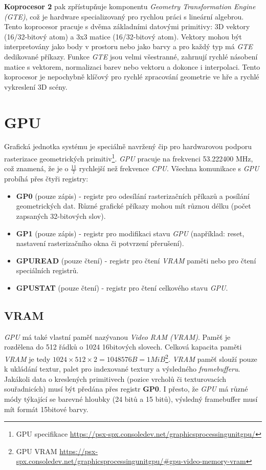 \textbf{Koprocesor 2} pak zpřístupňuje komponentu \textit{Geometry Transformation Engine (GTE)}, což je hardware specializovaný pro rychlou práci s lineární algebrou. 
Tento koprocesor pracuje s dvěma základními datovými primitivy: 3D vektory (16/32-bitový atom) a 3x3 matice (16/32-bitový atom). 
Vektory mohou být interpretovány jako body v prostoru nebo jako barvy a pro každý typ má \textit{GTE} dedikované příkazy. 
Funkce \textit{GTE} jsou velmi všestranné, zahrnují rychlé násobení matice s vektorem, normalizaci barev nebo vektoru a dokonce i interpolaci. 
Tento koprocesor je nepochybně klíčový pro rychlé zpracování geometrie ve hře a rychlé vykreslení 3D scény.

\section{GPU}

Grafická jednotka systému je speciálně navržený čip pro hardwarovou podporu rasterizace geometrických primitiv\footnote{GPU specifikace\cite{PSXSpec} \url{https://psx-spx.consoledev.net/graphicsprocessingunitgpu/}}.
\textit{GPU} pracuje na frekvenci 53.222400 MHz, což znamená, že je o $\frac{11}{7}$ rychlejší než frekvence \textit{CPU}. Všechna komunikace s \textit{GPU} probíhá přes
čtyři registry:

\begin{itemize}
\item{\textbf{GP0} (pouze zápis) - registr pro odesílání rasterizačních příkazů a posílání geometrických dat. Různé grafické příkazy mohou mít různou délku (počet zapsaných 32-bitových slov).}
\item{\textbf{GP1} (pouze zápis) - registr pro modifikaci stavu \textit{GPU} (například: reset, nastavení rasterizačního okna či potvrzení přerušení).}
\item{\textbf{GPUREAD} (pouze čtení) - registr pro čtení \textit{VRAM} paměti nebo pro čtení speciálních registrů.}
\item{\textbf{GPUSTAT} (pouze čtení) - registr pro čtení celkového stavu \textit{GPU}.}
\end{itemize}

\subsection{VRAM}

\textit{GPU} má také vlastní paměť nazývanou \textit{Video RAM (VRAM)}. Paměť je rozdělena do 512 řádků o 1024 16bitových slovech.
Celková kapacita paměti \textit{VRAM} je tedy $1024 \times 512 \times 2 = 1048576 B = 1 MiB$\footnote{GPU VRAM\cite{PSXSpec} \url{https://psx-spx.consoledev.net/graphicsprocessingunitgpu/\#gpu-video-memory-vram}}. 
\textit{VRAM} paměť slouží pouze k ukládání textur, palet pro
indexované textury a výsledného \textit{framebufferu}. Jakákoli data o kreslených primitivech (pozice vrcholů či texturovacích souřadnicích)
musí být předána přes registr \textbf{GP0}. I přesto, že \textit{GPU} má různé módy týkající se barevné hloubky (24 bitů a 15 bitů),
výsledný framebuffer musí mít formát 15bitové barvy.

